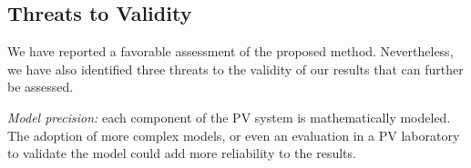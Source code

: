 \documentclass[review]{elsarticle}
\begin{document}
%
%
%
\subsection{Threats to Validity}
We have reported a favorable assessment of the proposed method. %
Nevertheless, we have also identified three threats to the validity of our results that can further be assessed.

\textit{Model precision:} each component of the PV system is mathematically modeled. %
The adoption of more complex models, or even an evaluation in a PV laboratory to validate the model could add more reliability to the results.
\end{document}

